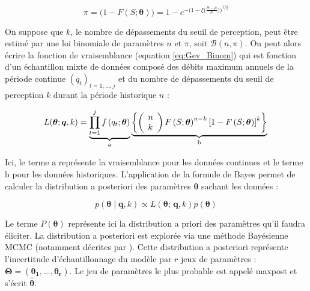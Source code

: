 \documentclass[11pt]{article}
\begin{document}
		\begin{equation}
			\pi = \biggl( 1 - F(S;\boldsymbol{\theta})\biggl) = 1 - e^{-\biggl(1-\xi\bigl(\frac{S-\mu}{\sigma}\bigl)\biggl)^{1/\xi} }		
		\end{equation}
			 
	On suppose que $k$, le nombre de dépassements du seuil de perception, peut être estimé par une loi binomiale de paramètres $n$ et $\pi$, soit $\mathcal{B}(n,\pi)$. On peut alors écrire la fonction de vraisemblance (equation \ref{eq:Gev_Binom}) qui est fonction d'un échantillon mixte de données composé des débits maximum annuels de la période continue $(q_t)_{t=1,...,j}$ et du nombre de dépassements du seuil de perception $k$ durant la période historique $n$ :
		
			\begin{equation}
			L(\boldsymbol{\theta} ; \boldsymbol{q}, k) = \underbrace{\prod_{t=1}^j f\left(q_t;\boldsymbol{\theta}\right)}_{\mathrm{a}} \underbrace{\left\{\left(\begin{array}{l}
			n \\
			k
			\end{array}\right) F\left(S;\boldsymbol{\theta}\right)^{n-k}\left[1-F\left(S;\boldsymbol{\theta}\right)\right]^k\right\}}_{\mathrm{b}} \\
			\label{eq:Gev_Binom}
			\end{equation}
			
			Ici, le terme $\mathrm{a}$ représente la vraisemblance pour les données continues et le terme $\mathrm{b}$ pour les données historiques. L'application de la formule de Bayes permet de calculer la distribution a posteriori des paramètres $\boldsymbol{\theta}$ sachant les données :
			
			\begin{equation}
				p(\boldsymbol{\theta} \mid \boldsymbol{q},k) \propto L(\boldsymbol{\theta};\,\boldsymbol{q},k) p(\boldsymbol{\theta})
				\label{eq:BayesBinom}
			\end{equation}
	
		Le terme $P(\boldsymbol{\theta})$ représente ici la distribution a priori des paramètres qu'il faudra éliciter. La distribution a posteriori est explorée via une méthode Bayésienne MCMC (notamment décrites par \citet{coles_classical_2001}). Cette distribution a posteriori représente l'incertitude d'échantillonnage du modèle par $r$ jeux de paramètres : $\boldsymbol{\Theta} = (\boldsymbol{\theta_1},...,\boldsymbol{\theta_r})$. Le jeu de paramètres le plus probable est appelé maxpost et s'écrit $\boldsymbol{ \hat{\theta} }$.
	
\end{document}
